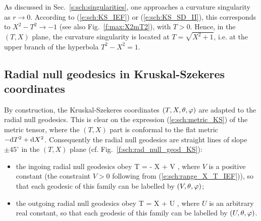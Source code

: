 As discussed in Sec.~\ref{s:sch:singularities}, one approaches a
curvature singularity as $r\rightarrow 0$. According to (\ref{e:sch:KS_IEF})
or (\ref{e:sch:KS_SD_II}),
this corresponds to $X^2-T^2 \rightarrow -1$ (see also Fig.~\ref{f:max:X2mT2}), with
$T > 0$. Hence, in the $(T,X)$ plane, the curvature singularity is located
at $T = \sqrt{X^2 + 1}$, i.e. at the upper branch of the hyperbola
$T^2 - X^2 = 1$.

\subsection{Radial null geodesics in Kruskal-Szekeres coordinates}
\label{s:sch:rad_null_geod_KS}

By construction, the Kruskal-Szekeres coordinates $(T,X,\theta,\varphi)$ are
adapted to the radial null geodesics. This is clear on the expression
(\ref{e:sch:metric_KS}) of the metric tensor, where the $(T,X)$ part is
conformal to the flat metric $- \mathrm{d} T^2 + \mathrm{d} X^2$. Consequently the radial
null geodesics are straight lines of slope $\pm 45^\circ$ in the $(T,X)$ plane
(cf. Fig.~\ref{f:sch:rad_null_geod_KS}):
\begin{itemize}
\item the ingoing radial null geodesics obey
\be \label{e:sch:ingoing_null_geod_KS}
    T = - X + V ,
\ee
where $V$ is a positive constant (the constraint $V>0$ following from (\ref{e:sch:range_X_T_IEF})), so that each geodesic of this family can be labelled
by $(V,\theta,\varphi)$;
\item the outgoing radial null geodesics obey
\be \label{e:sch:outgoing_null_geod_KS}
    T = X + U ,
\ee
where $U$ is an arbitrary real constant, so that each geodesic of this family can be labelled
by $(U,\theta,\varphi)$.
\end{itemize}
